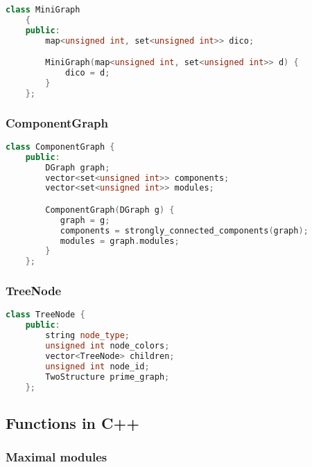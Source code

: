 \begin{lstlisting}[language=C++, style=cpp, caption={Defining the DGraph with C++}, label={lst:cpp-define-d-graph}, firstnumber=1]
    class MiniGraph
    {
    public:
        map<unsigned int, set<unsigned int>> dico;

        MiniGraph(map<unsigned int, set<unsigned int>> d) {
            dico = d;
        }
    };
\end{lstlisting}

\subsubsection{ComponentGraph}

\begin{lstlisting}[language=C++, style=cpp, caption={Defining the ComponentGraph with C++}, label={lst:cpp-define-component-graph}, firstnumber=1]
    class ComponentGraph {
    public:
        DGraph graph;
        vector<set<unsigned int>> components;
        vector<set<unsigned int>> modules;

        ComponentGraph(DGraph g) {
           graph = g;
           components = strongly_connected_components(graph);
           modules = graph.modules;
        }
    };
\end{lstlisting}

\subsubsection{TreeNode}

\begin{lstlisting}[language=C++, style=cpp, caption={Defining the TreeNode with C++}, label={lst:cpp-define-tree-node}, firstnumber=1]
    class TreeNode {
    public:
        string node_type;
        unsigned int node_colors;
        vector<TreeNode> children;
        unsigned int node_id;
        TwoStructure prime_graph;
    };
\end{lstlisting}

\subsection{Functions in C++}\label{subsec:functions-in-c++}

\subsubsection{Maximal modules}

